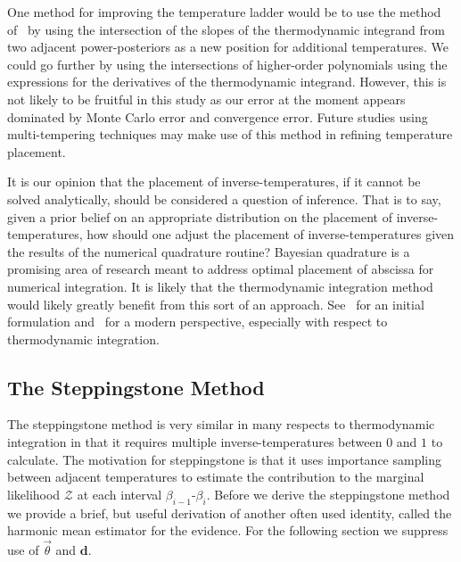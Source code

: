 One method for improving the temperature ladder would be to use the method of~\cite{friel2014improving} by using the intersection of the slopes of the thermodynamic integrand from two adjacent power-posteriors as a new position for additional temperatures. We could go further by using the intersections of higher-order polynomials using the expressions for the derivatives of the thermodynamic integrand. However, this is not likely to be fruitful in this study as our error at the moment appears dominated by Monte Carlo error and convergence error. Future studies using multi-tempering techniques may make use of this method in refining temperature placement.

It is our opinion that the placement of inverse-temperatures, if it cannot be solved analytically, should be considered a question of inference. That is to say, given a prior belief on an appropriate distribution on the placement of inverse-temperatures, how should one adjust the placement of inverse-temperatures given the results of the numerical quadrature routine? Bayesian quadrature is a promising area of research meant to address optimal placement of abscissa for numerical integration. It is likely that the thermodynamic integration method would likely greatly benefit from this sort of an approach. See~\cite{diaconis1988bayesian} for an initial formulation and~\cite{briol2015probabilistic} for a modern perspective, especially with respect to thermodynamic integration.

\subsection{The Steppingstone Method}
The steppingstone method is very similar in many respects to thermodynamic integration in that it requires multiple inverse-temperatures between $0$ and $1$ to calculate. The motivation for steppingstone is that it uses importance sampling between adjacent temperatures to estimate the contribution to the marginal likelihood $\mathcal{Z}$ at each interval $\beta_{i-1}$-$\beta_i$. Before we derive the steppingstone method we provide a brief, but useful derivation of another often used identity, called the harmonic mean estimator for the evidence. For the following section we suppress use of $\vec{\theta}$ and $\mathbf{d}$.


